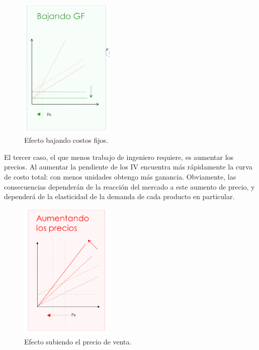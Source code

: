 \documentclass[titlepage,a4paper]{article}
\begin{document}
\begin{figure}[!htb]
    \centering
    \includegraphics[width=0.4\textwidth]{imagenes/KnoppelBajarfijo.PNG}
    \caption{Efecto bajando costos fijos.}
\end{figure}

El tercer caso, el que menos trabajo de ingeniero requiere, es aumentar los precios. Al aumentar la 
pendiente de los IV encuentra más rápidamente la curva de costo total: con menos unidades obtengo 
más ganancia. Obviamente, las consecuencias dependerán de la reacción del mercado a este aumento 
de precio, y dependerá de la elasticidad de la demanda de cada producto en particular.

\begin{figure}[!htb]
    \centering
    \includegraphics[width=0.4\textwidth]{imagenes/KnoppelSubirPrecio.PNG}
    \caption{Efecto subiendo el precio de venta.}
\end{figure}

\newpage
\end{document}
